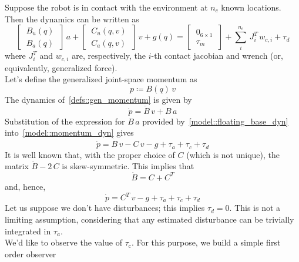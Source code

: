 \documentclass[letterpaper, 10 pt, conference]{ieeeconf}  %
\begin{document}
Suppose the robot is in contact with the environment at $n_c$ known locations. Then the dynamics can be written as
\begin{dmath}\label{model::floating_base_with_contact}
\begin{bmatrix}
~B_u(q)~\\
~B_a(q)~
\end{bmatrix}\,a + \begin{bmatrix}
~C_u(q, v)~\\
~C_a(q, v)~
\end{bmatrix}\,v + g(q) = \begin{bmatrix}
~0_{6\times 1}~\\
~\tau_{m}~
\end{bmatrix} +  \sum_{i}^{n_c}\,J^{T}_{i}\,w_{c, i} + \tau_{d}
\end{dmath}
where $J^{T}_{i}$ and $w_{c, i}$ are, respectively, the $i$-th contact jacobian and wrench (or, equivalently, generalized force). \\
Let's define the generalized joint-space momentum as
\begin{equation}\label{defs::gen_momentum}
p \coloneqq B(q)\,v
\end{equation}
The dynamics of~\eqref{defs::gen_momentum} is given by 
\begin{equation}\label{model::momentum_dyn}
\dot{p} = \dot{B}\,v + B\,a
\end{equation}
Substitution of the expression for $B\,a$ provided by~\eqref{model::floating_base_dyn} into~\eqref{model::momentum_dyn} gives
\begin{equation}\label{model::momentum_dyn_raw}
\dot{p} = \dot{B}\,v - C\,v - g + \tau_a + \tau_c + \tau_d
\end{equation}
It is well known that, with the proper choice of $C$ (which is not unique), the matrix $\dot{B} - 2\,C$ is skew-symmetric. This implies that
\begin{equation}\label{model::Bdotm2C}
\dot{B} = C + C^T
\end{equation}
and, hence, 
\begin{equation}\label{model::momentum_dyn_skew}
\dot{p} = C^T\,v - g + \tau_a + \tau_c + \tau_d
\end{equation}
Let us suppose we don't have disturbances; this implies $\tau_d = 0$. This is not a limiting assumption, considering that any estimated disturbance can be trivially integrated in $\tau_a$.\\
We'd like to observe the value of $\tau_{\mathrm{c}}$. For this purpose, we build a simple first order observer
\end{document}
